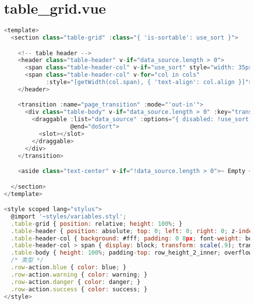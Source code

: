 \section{table\_grid.vue}


\begin{lstlisting}[language=JavaScript]
<template>
  <section class="table-grid" :class="{ 'is-sortable': use_sort }">

    <!-- table header -->
    <header class="table-header" v-if="data_source.length > 0">
      <span class="table-header-col" v-if="use_sort" style="width: 35px;"><span>排序</span></span>
      <span class="table-header-col" v-for="col in cols"
            :style="[getWidth(col.span), { 'text-align': col.align }]"><span v-html="col.col_title"></span></span>
    </header>

    <transition :name="page_transition" :mode="'out-in'">
      <div class="table-body" v-if="data_source.length > 0" :key="transition_key">
        <draggable :list="data_source" :options="{ disabled: !use_sort, animation: 150, handle: '.drag-handle' }"
                   @end="doSort">
          <slot></slot>
        </draggable>
      </div>
    </transition>

    <aside class="text-center" v-if="!data_source.length > 0">~ Empty ~</aside>

  </section>
</template>

<style scoped lang="stylus">
  @import '~styles/variables.styl';
  .table-grid { position: relative; height: 100%; }
  .table-header { position: absolute; top: 0; left: 0; right: 0; z-index: 100; display: flex; line-height: row_height_2_inner; white-space: nowrap; box-shadow: 0 1px 2px -1px rgba(0, 0, 0, .3); }
  .table-header-col { background: #fff; padding: 0 8px; font-weight: bold; }
  .table-header-col > span { display: block; transform: scale(.9); transform-origin: 0 100%; }
  .table-body { height: 100%; padding-top: row_height_2_inner; overflow-y: auto; }
  /* 类型 */
  .row-action.blue { color: blue; }
  .row-action.warning { color: warning; }
  .row-action.danger { color: danger; }
  .row-action.success { color: success; }
</style>


\end{lstlisting}

